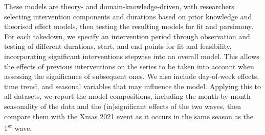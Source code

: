 \documentclass[letterpaper,twocolumn,10pt]{article}
\begin{document}
These models are theory- and domain-knowledge-driven, with researchers selecting intervention components and durations based on prior knowledge and theorised effect models, then testing the resulting models for fit and parsimony. For each takedown, we specify an intervention period through observation and testing of different durations, start, and end points for fit and feasibility, incorporating significant interventions stepwise into an overall model. This allows the effects of previous interventions on the series to be taken into account when assessing the significance of subsequent ones. We also include day-of-week effects, time trend, and seasonal variables that may influence the model.
Applying this to all datasets, we report the model compositions, including the month-by-month seasonality of the data and the (in)significant effects of the two waves, then compare them with the Xmas 2021 event as it occurs in the same season as the 1\textsuperscript{st} wave.
\end{document}

